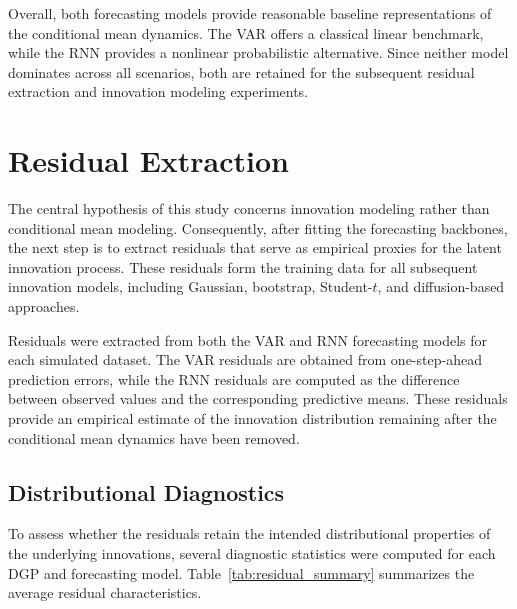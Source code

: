 \documentclass[11pt]{article}
\begin{document}
Overall, both forecasting models provide reasonable baseline representations of the conditional mean dynamics. The VAR offers a classical linear benchmark, while the RNN provides a nonlinear probabilistic alternative. Since neither model dominates across all scenarios, both are retained for the subsequent residual extraction and innovation modeling experiments.



\section{Residual Extraction}

The central hypothesis of this study concerns innovation modeling rather than conditional mean modeling. Consequently, after fitting the forecasting backbones, the next step is to extract residuals that serve as empirical proxies for the latent innovation process. These residuals form the training data for all subsequent innovation models, including Gaussian, bootstrap, Student-\(t\), and diffusion-based approaches.

Residuals were extracted from both the VAR and RNN forecasting models for each simulated dataset. The VAR residuals are obtained from one-step-ahead prediction errors, while the RNN residuals are computed as the difference between observed values and the corresponding predictive means. These residuals provide an empirical estimate of the innovation distribution remaining after the conditional mean dynamics have been removed.

\subsection*{Distributional Diagnostics}

To assess whether the residuals retain the intended distributional properties of the underlying innovations, several diagnostic statistics were computed for each DGP and forecasting model. Table~\ref{tab:residual_summary} summarizes the average residual characteristics.
\end{document}
